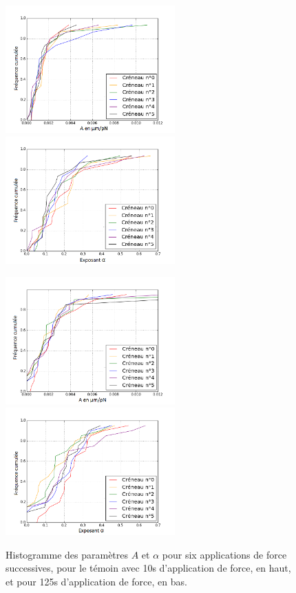 \documentclass                                                                                                                                                                                                                                                                                                                                       {report}
\begin{document}
\begin{center}
\begin{figure}[p]
\includegraphics[width=6.5cm]{Figures/A_creneaux_temoin.png}
\includegraphics[width=6.5cm]{Figures/E_creneaux_temoin.png} 

\includegraphics[width=6.5cm]{Figures/A_creneaux_S2.png} 
\includegraphics[width=6.5cm]{Figures/E_creneaux_S2.png} 
\caption{\label{Evolution_6c} Histogramme des paramètres $A$ et $\alpha$ pour six applications de force successives, pour le témoin avec 10s d’application de force, en haut, et pour 125s d’application de force, en bas.}
\end{figure}
\end{center}
\end{document}
